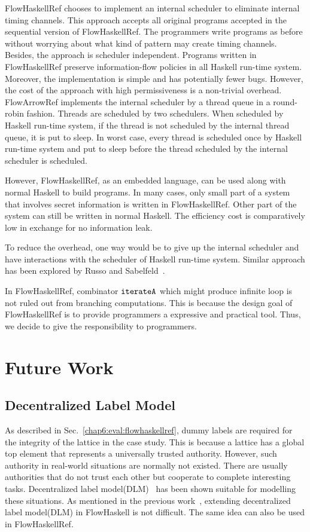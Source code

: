 \documentclass[a4paper]{report}
\newcommand{\co}[1]{$\cod{#1}$}
\begin{document}
FlowHaskellRef chooses to implement an internal scheduler to eliminate internal timing channels.
This approach accepts all original programs accepted in the sequential version of FlowHaskellRef. The programmers
write programs as before without worrying about what kind of pattern may create timing channels.
Besides, the approach is scheduler independent. Programs written in FlowHaskellRef preserve
information-flow policies in all Haskell run-time system.
Moreover, the implementation is simple and has potentially fewer bugs.
However, the cost of the approach with high permissiveness is a non-trivial overhead. 
FlowArrowRef implements the internal scheduler by a thread queue in a round-robin fashion. 
Threads are scheduled by two schedulers. When scheduled by Haskell run-time system, if
the thread is not scheduled by the internal thread queue, it is put to sleep. 
In worst case, every thread is scheduled once by Haskell run-time system and put to sleep before the thread
scheduled by the internal scheduler is scheduled.

However, FlowHaskellRef, as an embedded language, can be used along with normal Haskell to build programs.
In many cases, only small part of a system that involves secret information is 
written in FlowHaskellRef. Other part of the system can still be written in normal Haskell. 
The efficiency cost is comparatively low in exchange for no information leak.

To reduce the overhead, one way would be to give up the internal scheduler and have interactions with the scheduler 
of Haskell run-time system. Similar approach has been explored by Russo and Sabelfeld~\cite{Russo:Sabelfeld:CSFW06}.

In FlowHaskellRef, combinator \co{iterateA} which might produce infinite loop is not ruled out from
branching computations. This is because the design goal of FlowHaskellRef is to provide programmers
a expressive and practical tool. Thus, we decide to give the responsibility to programmers. 

\section{Future Work}
\subsection{Decentralized Label Model}
As described in Sec.~\ref{chap6:eval:flowhaskellref}, dummy labels are required for the integrity
of the lattice in the case study. This is because a lattice has a global top element that
represents a universally trusted authority. However, such authority in real-world situations are normally 
not existed. There are usually authorities that do not trust each other but cooperate to complete
interesting tasks. Decentralized label model(DLM)~\cite{Myers:Liskov:TSEM2000} has been shown suitable for
modelling these situations. As mentioned in the previous work~\cite{Li:Zdancewic:CSFW}, extending 
decentralized label model(DLM) in FlowHaskell is not difficult. The same idea can also be used in
FlowHaskellRef.
\end{document}
